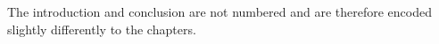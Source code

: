 \cleardoublepage
{}

The introduction and conclusion are not numbered and are therefore encoded slightly differently to the chapters.